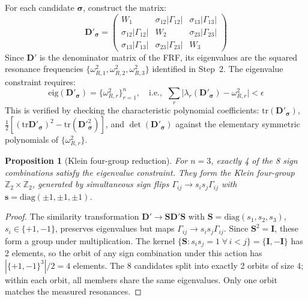 \documentclass[10pt,twocolumn]{article}
\newtheorem{proposition}{Proposition}
\newcommand{\tr}{\mathrm{tr}}
\newcommand{\diag}{\mathrm{diag}}
\begin{document}
For each candidate $\bm{\sigma}$, construct the matrix:
\begin{equation}
\bm{D}'_{\bm{\sigma}} = \begin{pmatrix}
W_1 & \sigma_{12}|\Gamma_{12}| & \sigma_{13}|\Gamma_{13}| \\
\sigma_{12}|\Gamma_{12}| & W_2 & \sigma_{23}|\Gamma_{23}| \\
\sigma_{13}|\Gamma_{13}| & \sigma_{23}|\Gamma_{23}| & W_3
\end{pmatrix}
\label{eq:Dsigma}
\end{equation}
Since $\bm{D}'$ is the denominator matrix of the FRF, its eigenvalues are the squared resonance frequencies $\{\omega_{R,1}^2, \omega_{R,2}^2, \omega_{R,3}^2\}$ identified in Step~2. The eigenvalue constraint requires:
\begin{equation}
\mathrm{eig}(\bm{D}'_{\bm{\sigma}}) = \{\omega_{R,r}^2\}_{r=1}^{n}, \quad
\text{i.e.,}\;\; \sum_{r}\bigl|\lambda_r(\bm{D}'_{\bm{\sigma}}) - \omega_{R,r}^2\bigr| < \epsilon
\label{eq:eig_constraint}
\end{equation}
This is verified by checking the characteristic polynomial coefficients: $\tr(\bm{D}'_{\bm{\sigma}})$, $\frac{1}{2}[(\tr \bm{D}'_{\bm{\sigma}})^2 - \tr(\bm{D}'^2_{\bm{\sigma}})]$, and $\det(\bm{D}'_{\bm{\sigma}})$ against the elementary symmetric polynomials of $\{\omega_{R,r}^2\}$.

\begin{proposition}[Klein four-group reduction]
For $n{=}3$, exactly 4 of the 8 sign combinations satisfy the eigenvalue constraint. They form the Klein four-group $\mathbb{Z}_2 \times \mathbb{Z}_2$, generated by simultaneous sign flips $\Gamma_{ij} \to s_i s_j \Gamma_{ij}$ with $\bm{s} = \diag(\pm1,\pm1,\pm1)$.
\label{prop:klein}
\end{proposition}
\begin{proof}
The similarity transformation $\bm{D}' \to \bm{S}\bm{D}'\bm{S}$ with $\bm{S} = \diag(s_1,s_2,s_3)$, $s_i \in \{+1,-1\}$, preserves eigenvalues but maps $\Gamma_{ij} \to s_i s_j \Gamma_{ij}$. Since $\bm{S}^2 = \bm{I}$, these form a group under multiplication. The kernel $\{\bm{S}: s_i s_j = 1\;\forall\,i<j\} = \{\bm{I}, -\bm{I}\}$ has 2 elements, so the orbit of any sign combination under this action has $|\{+1,-1\}^3|/2 = 4$ elements. The 8 candidates split into exactly 2 orbits of size 4; within each orbit, all members share the same eigenvalues. Only one orbit matches the measured resonances.
\end{proof}
\end{document}
